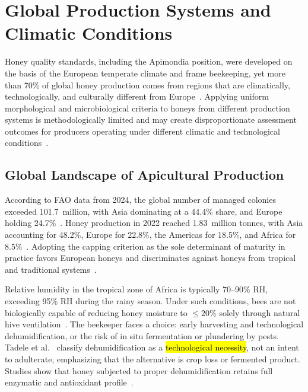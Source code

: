 \documentclass[foods,review,accept,pdftex,moreauthors]{Definitions/mdpi}
\begin{document}
{\section{Global Production Systems and Climatic Conditions}\label{5}

Honey quality standards, including the Apimondia position, were
developed on the basis of the European temperate climate and
frame beekeeping, yet more than 70\% of global honey production
comes from regions that are climatically, technologically, and
culturally different from
Europe~\cite{garcia2025,eudir2001110}. Applying uniform morphological and microbiological criteria to honeys from different production systems is methodologically limited and may create disproportionate assessment outcomes for producers operating under different climatic and technological conditions~\cite{phiri2022,tadele2025}.


\subsection{Global Landscape of Apicultural Production}


According to FAO data from 2024, the global number of managed
colonies exceeded 101.7~million, with Asia dominating
at a 44.4\% share, and Europe holding 24.7\%~\cite{destatis2026}.
Honey production in 2022 reached 1.83~million tonnes, with
Asia accounting for 48.2\%, Europe for 22.8\%, the Americas
for 18.5\%, and Africa for 8.5\%~\cite{phiri2022}. Adopting
the capping criterion as the sole determinant of maturity in
practice favors European honeys and discriminates against honeys
from tropical and traditional
systems~\cite{tadele2025,phiri2022}.





Relative humidity in the tropical zone of Africa is typically
70--90\% RH, exceeding 95\% RH during the rainy season.
Under such conditions, bees are not biologically capable of
reducing honey moisture to $\leq$$20\%$ solely through natural
hive ventilation~\cite{tadele2025}. The beekeeper faces a choice:
early harvesting and technological dehumidification, or the risk
of in situ fermentation or plundering by pests. Tadele et al.~\cite{tadele2025}
classify dehumidification as a \hl{technological necessity},
not an intent to adulterate, emphasizing that the alternative
is crop loss or fermented product. Studies show that honey
subjected to proper dehumidification retains full enzymatic
and antioxidant profile~\cite{lastriyanto2020,spel3upm}.

}
\end{document}
